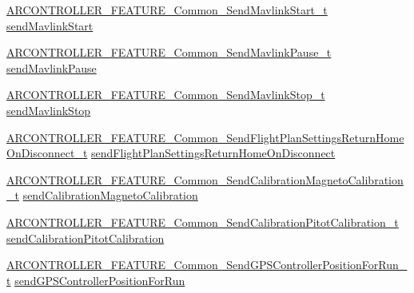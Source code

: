 \begin{DoxyCompactItemize}
\item 
\hyperlink{_a_r_c_o_n_t_r_o_l_l_e_r___feature_8h_ab16664ea571ca78fc35f53418efafc2c}{A\+R\+C\+O\+N\+T\+R\+O\+L\+L\+E\+R\+\_\+\+F\+E\+A\+T\+U\+R\+E\+\_\+\+Common\+\_\+\+Send\+Mavlink\+Start\+\_\+t} \hyperlink{struct_a_r_c_o_n_t_r_o_l_l_e_r___f_e_a_t_u_r_e___common__t_abbb54c8ac22a93d68dfe8b94e89a0c21}{send\+Mavlink\+Start}
\item 
\hyperlink{_a_r_c_o_n_t_r_o_l_l_e_r___feature_8h_a33c525754c362b742c4ad2971b7509e4}{A\+R\+C\+O\+N\+T\+R\+O\+L\+L\+E\+R\+\_\+\+F\+E\+A\+T\+U\+R\+E\+\_\+\+Common\+\_\+\+Send\+Mavlink\+Pause\+\_\+t} \hyperlink{struct_a_r_c_o_n_t_r_o_l_l_e_r___f_e_a_t_u_r_e___common__t_a558aaf4ea58f92f4220e0e933d95bf1c}{send\+Mavlink\+Pause}
\item 
\hyperlink{_a_r_c_o_n_t_r_o_l_l_e_r___feature_8h_ad97dd25a962752c58ae3cdbd9939c1c2}{A\+R\+C\+O\+N\+T\+R\+O\+L\+L\+E\+R\+\_\+\+F\+E\+A\+T\+U\+R\+E\+\_\+\+Common\+\_\+\+Send\+Mavlink\+Stop\+\_\+t} \hyperlink{struct_a_r_c_o_n_t_r_o_l_l_e_r___f_e_a_t_u_r_e___common__t_a1d4b7a79306908fdc779421d6d670464}{send\+Mavlink\+Stop}
\item 
\hyperlink{_a_r_c_o_n_t_r_o_l_l_e_r___feature_8h_ae9ea9454c3bf6cb9cb24cace517d5c84}{A\+R\+C\+O\+N\+T\+R\+O\+L\+L\+E\+R\+\_\+\+F\+E\+A\+T\+U\+R\+E\+\_\+\+Common\+\_\+\+Send\+Flight\+Plan\+Settings\+Return\+Home\+On\+Disconnect\+\_\+t} \hyperlink{struct_a_r_c_o_n_t_r_o_l_l_e_r___f_e_a_t_u_r_e___common__t_a5c4a50a74be55ae4d452e59505d6d7ed}{send\+Flight\+Plan\+Settings\+Return\+Home\+On\+Disconnect}
\item 
\hyperlink{_a_r_c_o_n_t_r_o_l_l_e_r___feature_8h_add54f7a924c4dd73d39c3fbe1ba3b742}{A\+R\+C\+O\+N\+T\+R\+O\+L\+L\+E\+R\+\_\+\+F\+E\+A\+T\+U\+R\+E\+\_\+\+Common\+\_\+\+Send\+Calibration\+Magneto\+Calibration\+\_\+t} \hyperlink{struct_a_r_c_o_n_t_r_o_l_l_e_r___f_e_a_t_u_r_e___common__t_a6c18926a6f2ad1c9d01481313a95bb52}{send\+Calibration\+Magneto\+Calibration}
\item 
\hyperlink{_a_r_c_o_n_t_r_o_l_l_e_r___feature_8h_a497fa55156a0641a2054abb734e80947}{A\+R\+C\+O\+N\+T\+R\+O\+L\+L\+E\+R\+\_\+\+F\+E\+A\+T\+U\+R\+E\+\_\+\+Common\+\_\+\+Send\+Calibration\+Pitot\+Calibration\+\_\+t} \hyperlink{struct_a_r_c_o_n_t_r_o_l_l_e_r___f_e_a_t_u_r_e___common__t_a28bc04f2e205263964e0c6b3b8789c7e}{send\+Calibration\+Pitot\+Calibration}
\item 
\hyperlink{_a_r_c_o_n_t_r_o_l_l_e_r___feature_8h_ae1cc7f18dfa4810ab33609da3ea93196}{A\+R\+C\+O\+N\+T\+R\+O\+L\+L\+E\+R\+\_\+\+F\+E\+A\+T\+U\+R\+E\+\_\+\+Common\+\_\+\+Send\+G\+P\+S\+Controller\+Position\+For\+Run\+\_\+t} \hyperlink{struct_a_r_c_o_n_t_r_o_l_l_e_r___f_e_a_t_u_r_e___common__t_a862a3ad365850ae20da1e045d18099e2}{send\+G\+P\+S\+Controller\+Position\+For\+Run}

\end{DoxyCompactItemize}
